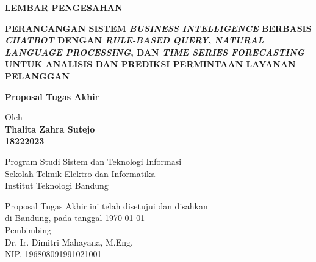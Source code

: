 \documentclass[12pt,a4paper,oneside]{book}
\begin{document}
\newpage
\thispagestyle{empty}
\begin{center}
  \textbf{\large LEMBAR PENGESAHAN}\\[1cm]
  \vspace*{1.5cm}
    
  {\large\bfseries PERANCANGAN SISTEM \textit{BUSINESS INTELLIGENCE} BERBASIS \textit{CHATBOT} DENGAN \textit{RULE-BASED QUERY}, \textit{NATURAL LANGUAGE PROCESSING}, DAN \textit{TIME SERIES FORECASTING} UNTUK ANALISIS DAN PREDIKSI PERMINTAAN LAYANAN PELANGGAN}\\
     \vspace{2cm}

  {\Large \textbf{Proposal Tugas Akhir}}\\


  \vspace{1.5cm}
    
    
  {\large Oleh}\\[0.3cm]
    \textbf{
    {\large Thalita Zahra Sutejo}\\
    {\large 18222023}
  }\\
    
  \vspace{0.5cm}
 
  {\large Program Studi Sistem dan Teknologi Informasi}\\
  {\large Sekolah Teknik Elektro dan Informatika}\\
  {\large Institut Teknologi Bandung}\\

  \vspace{1.5cm}

  Proposal Tugas Akhir ini telah disetujui dan disahkan\\ 
  di Bandung, pada tanggal \today\\[1cm]

	Pembimbing  \\[3cm]
	Dr. Ir. Dimitri Mahayana, M.Eng.   \\[0.2cm]
	NIP. 196808091991021001 

\end{center}

\vspace{1cm}
\noindent
\end{document}
